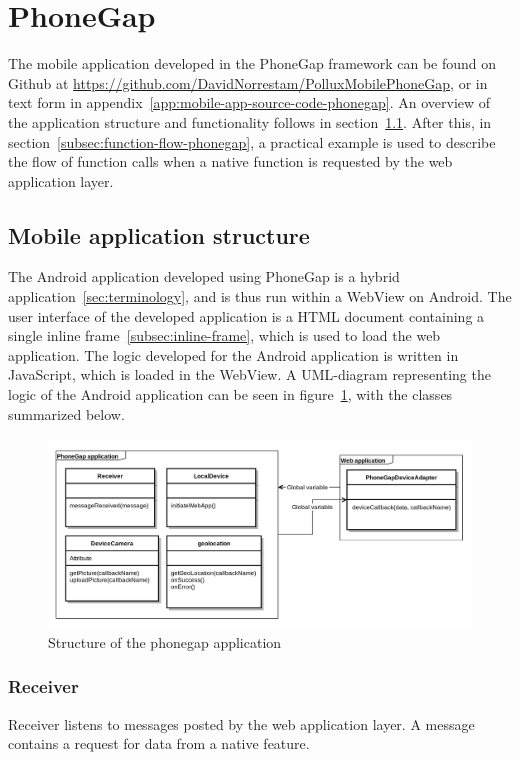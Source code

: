 \section{PhoneGap}\label{sec:phonegap}
The mobile application developed in the PhoneGap framework can be found on Github at \url{https://github.com/DavidNorrestam/PolluxMobilePhoneGap}, or in text form in appendix~\ref{app:mobile-app-source-code-phonegap}. An overview of the application structure and functionality follows in section~\ref{subsec:application-structure-phonegap}. After this, in section~\ref{subsec:function-flow-phonegap}, a practical example is used to describe the flow of function calls when a native function is requested by the web application layer.


\subsection{Mobile application structure} \label{subsec:application-structure-phonegap}
The Android application developed using PhoneGap is a hybrid application~\ref{sec:terminology}, and is thus run within a WebView on Android. The user interface of the developed application is a HTML document containing a single inline frame~\ref{subsec:inline-frame}, which is used to load the web application. The logic developed for the Android application is written in JavaScript, which is loaded in the WebView. A UML-diagram representing the logic of the Android application can be seen in figure~\ref{fig:phonegapuml}, with the classes summarized below.
\begin{figure}[h!]
	\centering
    \includegraphics[width=150mm,natwidth=1000,natheight=750]{./img/phonegapuml.png}
    \caption{Structure of the phonegap application}
    \label{fig:phonegapuml}
\end{figure}

\subsubsection{Receiver}
Receiver listens to messages posted by the web application layer. A message contains a request for data from a native feature.
\label{fig:phonegapflow}
